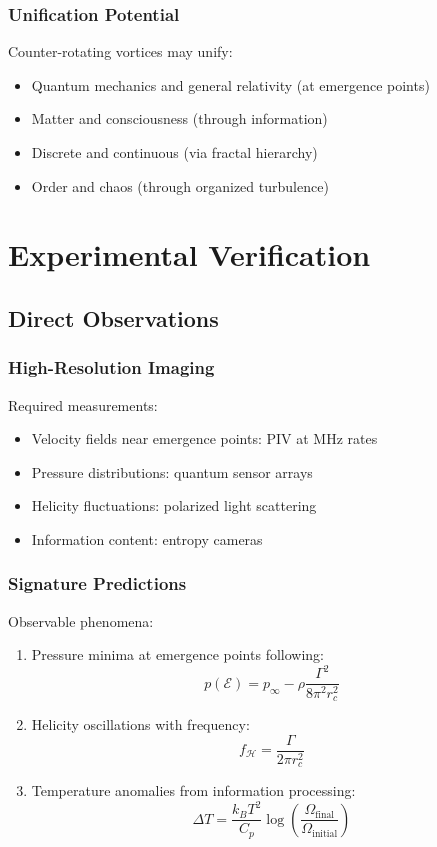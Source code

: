 \documentclass[12pt]{article}
\newcommand{\emergencept}{\mathcal{E}}
\newcommand{\helicity}{\mathcal{H}}
\begin{document}
\subsubsection{Unification Potential}

Counter-rotating vortices may unify:
\begin{itemize}
\item Quantum mechanics and general relativity (at emergence points)
\item Matter and consciousness (through information)
\item Discrete and continuous (via fractal hierarchy)
\item Order and chaos (through organized turbulence)
\end{itemize}

\section{Experimental Verification}

\subsection{Direct Observations}

\subsubsection{High-Resolution Imaging}

Required measurements:
\begin{itemize}
\item Velocity fields near emergence points: PIV at MHz rates
\item Pressure distributions: quantum sensor arrays
\item Helicity fluctuations: polarized light scattering
\item Information content: entropy cameras
\end{itemize}

\subsubsection{Signature Predictions}

Observable phenomena:
\begin{enumerate}
\item Pressure minima at emergence points following:
\begin{equation}
p(\emergencept) = p_\infty - \rho \frac{\Gamma^2}{8\pi^2 r_c^2}
\end{equation}

\item Helicity oscillations with frequency:
\begin{equation}
f_{\helicity} = \frac{\Gamma}{2\pi r_c^2}
\end{equation}

\item Temperature anomalies from information processing:
\begin{equation}
\Delta T = \frac{k_B T^2}{C_p} \log\left(\frac{\Omega_{\text{final}}}{\Omega_{\text{initial}}}\right)
\end{equation}
\end{enumerate}
\end{document}
